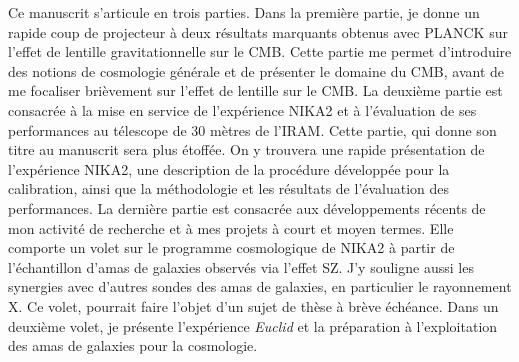 Ce manuscrit s'articule en trois parties. Dans la première partie, je
donne un rapide coup de projecteur à deux résultats marquants obtenus
avec PLANCK sur l'effet de lentille gravitationnelle sur le CMB. Cette
partie me permet d'introduire des notions de cosmologie générale et de
présenter le domaine du CMB, avant de me focaliser brièvement sur l'effet de
lentille sur le CMB. La deuxième partie est consacrée à la mise en
service de l'expérience NIKA2 et à l'évaluation de ses performances au
télescope de 30 mètres de l'IRAM. Cette partie, qui donne son titre au
manuscrit sera plus étoffée. On y trouvera une rapide présentation de
l'expérience NIKA2, une description de la procédure développée pour la
calibration, ainsi que la méthodologie et les résultats de
l'évaluation des performances. La dernière partie est consacrée aux
développements récents de mon activité de recherche et à mes projets à
court et moyen termes. Elle comporte un volet sur
le programme cosmologique de NIKA2 à partir de l'échantillon d'amas de
galaxies observés via l'effet SZ. J'y souligne aussi les synergies
avec d'autres sondes des amas de galaxies, en particulier le
rayonnement X. Ce volet, pourrait faire l'objet d'un sujet de thèse à
brève échéance. Dans un deuxième volet, je présente
l'expérience \emph{Euclid} et la préparation à l'exploitation des amas
de galaxies pour la cosmologie. 



